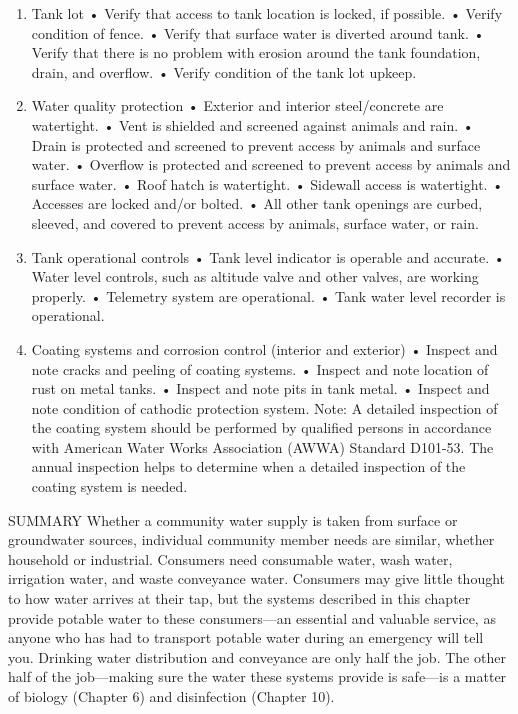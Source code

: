 \documentclass{article}
\begin{document}
\begin{enumerate}
\item
  Tank lot • Verify that access to tank location is locked, if possible.
  • Verify condition of fence. • Verify that surface water is diverted
  around tank. • Verify that there is no problem with erosion around the
  tank foundation, drain, and overflow. • Verify condition of the tank
  lot upkeep.
\item
  Water quality protection • Exterior and interior steel/concrete are
  watertight. • Vent is shielded and screened against animals and rain.
  • Drain is protected and screened to prevent access by animals and
  surface water. • Overflow is protected and screened to prevent access
  by animals and surface water. • Roof hatch is watertight. • Sidewall
  access is watertight. • Accesses are locked and/or bolted. • All other
  tank openings are curbed, sleeved, and covered to prevent access by
  animals, surface water, or rain.
\item
  Tank operational controls • Tank level indicator is operable and
  accurate. • Water level controls, such as altitude valve and other
  valves, are working properly. • Telemetry system are operational. •
  Tank water level recorder is operational.
\item
  Coating systems and corrosion control (interior and exterior) •
  Inspect and note cracks and peeling of coating systems. • Inspect and
  note location of rust on metal tanks. • Inspect and note pits in tank
  metal. • Inspect and note condition of cathodic protection system.
  Note: A detailed inspection of the coating system should be performed
  by qualified persons in accordance with American Water Works
  Association (AWWA) Standard D101-53. The annual inspection helps to
  determine when a detailed inspection of the coating system is needed.
\end{enumerate}

SUMMARY Whether a community water supply is taken from surface or
groundwater sources, individual community member needs are similar,
whether household or industrial. Consumers need consumable water, wash
water, irrigation water, and waste conveyance water. Consumers may give
little thought to how water arrives at their tap, but the systems
described in this chapter provide potable water to these consumers---an
essential and valuable service, as anyone who has had to transport
potable water during an emergency will tell you. Drinking water
distribution and conveyance are only half the job. The other half of the
job---making sure the water these systems provide is safe---is a matter
of biology (Chapter 6) and disinfection (Chapter 10).
\end{document}
